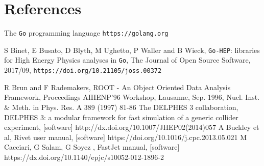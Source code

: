 \documentclass[a4paper]{jpconf}
\begin{document}
\section*{References}

\begin{thebibliography}{3}

 The \texttt{Go} programming language
  \verb'https://golang.org' 

 S Binet, E Busato, D Blyth, M Ughetto, P Waller and B Wieck,
	\texttt{Go-HEP}: libraries for High Energy Physics analyses in \texttt{Go},
	The Journal of Open Source Software, 2017/09,
	\texttt{https://doi.org/10.21105/joss.00372}

 R Brun and F Rademakers, ROOT - An Object Oriented Data Analysis Framework, Proceedings AIHENP'96 Workshop, Lausanne, Sep. 1996, Nucl. Inst. \& Meth. in Phys. Res. A 389 (1997) 81-86
 The DELPHES 3 collaboration, DELPHES 3: a modular framework for fast simulation of a generic collider experiment, [software] http://dx.doi.org/10.1007/JHEP02(2014)057
 A Buckley et al, Rivet user manual, [software] https://doi.org/10.1016/j.cpc.2013.05.021
 M Cacciari, G Salam, G Soyez , FastJet manual, [software] https://dx.doi.org/10.1140/epjc/s10052-012-1896-2

\end{thebibliography}
\end{document}
